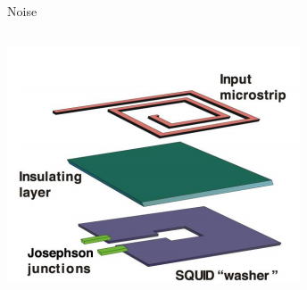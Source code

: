 \documentclass{beamer}
\begin{document}
\begin{frame}{Noise}
\begin{columns}
\includegraphics[width=\textwidth]{msa_exploded_view}


\end{columns}
\end{frame}
\end{document}
